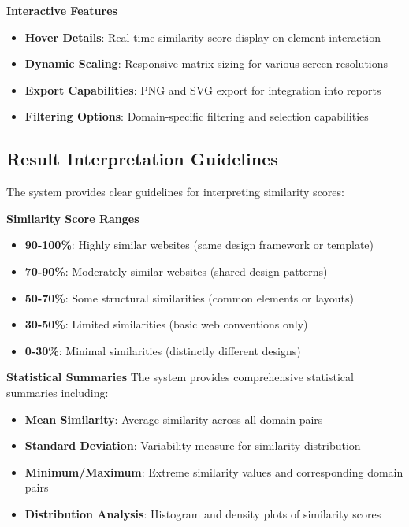 \textbf{Interactive Features}
\begin{itemize}
    \item \textbf{Hover Details}: Real-time similarity score display on element interaction
    \item \textbf{Dynamic Scaling}: Responsive matrix sizing for various screen resolutions
    \item \textbf{Export Capabilities}: PNG and SVG export for integration into reports
    \item \textbf{Filtering Options}: Domain-specific filtering and selection capabilities
\end{itemize}

\subsection{Result Interpretation Guidelines}
\label{subsec:result-interpretation}

The system provides clear guidelines for interpreting similarity scores:

\textbf{Similarity Score Ranges}
\begin{itemize}
    \item \textbf{90-100\%}: Highly similar websites (same design framework or template)
    \item \textbf{70-90\%}: Moderately similar websites (shared design patterns)
    \item \textbf{50-70\%}: Some structural similarities (common elements or layouts)
    \item \textbf{30-50\%}: Limited similarities (basic web conventions only)
    \item \textbf{0-30\%}: Minimal similarities (distinctly different designs)
\end{itemize}

\textbf{Statistical Summaries}
The system provides comprehensive statistical summaries including:
\begin{itemize}
    \item \textbf{Mean Similarity}: Average similarity across all domain pairs
    \item \textbf{Standard Deviation}: Variability measure for similarity distribution
    \item \textbf{Minimum/Maximum}: Extreme similarity values and corresponding domain pairs
    \item \textbf{Distribution Analysis}: Histogram and density plots of similarity scores
\end{itemize}

